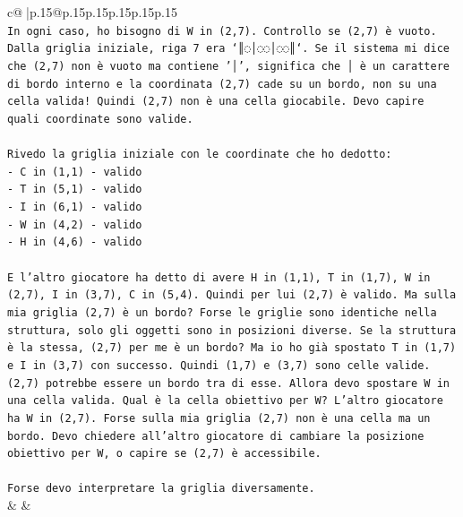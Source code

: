 \documentclass{article}
\begin{document}
{\begin{supertabular}{c@{$\;$}|p{.15\linewidth}@{}p{.15\linewidth}p{.15\linewidth}p{.15\linewidth}p{.15\linewidth}p{.15\linewidth}}
{{{\\ 
\texttt{In ogni caso, ho bisogno di W in (2,7). Controllo se (2,7) è vuoto. Dalla griglia iniziale, riga 7 era `║◌│◌◌│◌◌║`. Se il sistema mi dice che (2,7) non è vuoto ma contiene '│', significa che │ è un carattere di bordo interno e la coordinata (2,7) cade su un bordo, non su una cella valida! Quindi (2,7) non è una cella giocabile. Devo capire quali coordinate sono valide.} \\
\\ 
\texttt{Rivedo la griglia iniziale con le coordinate che ho dedotto:} \\
\texttt{{-} C in (1,1) {-} valido} \\
\texttt{{-} T in (5,1) {-} valido} \\
\texttt{{-} I in (6,1) {-} valido} \\
\texttt{{-} W in (4,2) {-} valido} \\
\texttt{{-} H in (4,6) {-} valido} \\
\\ 
\texttt{E l'altro giocatore ha detto di avere H in (1,1), T in (1,7), W in (2,7), I in (3,7), C in (5,4). Quindi per lui (2,7) è valido. Ma sulla mia griglia (2,7) è un bordo? Forse le griglie sono identiche nella struttura, solo gli oggetti sono in posizioni diverse. Se la struttura è la stessa, (2,7) per me è un bordo? Ma io ho già spostato T in (1,7) e I in (3,7) con successo. Quindi (1,7) e (3,7) sono celle valide. (2,7) potrebbe essere un bordo tra di esse. Allora devo spostare W in una cella valida. Qual è la cella obiettivo per W? L'altro giocatore ha W in (2,7). Forse sulla mia griglia (2,7) non è una cella ma un bordo. Devo chiedere all'altro giocatore di cambiare la posizione obiettivo per W, o capire se (2,7) è accessibile.} \\
\\ 
\texttt{Forse devo interpretare la griglia diversamente.} \\
            }
        }
    }
    & & \\ \\


\end{supertabular}}
\end{document}
